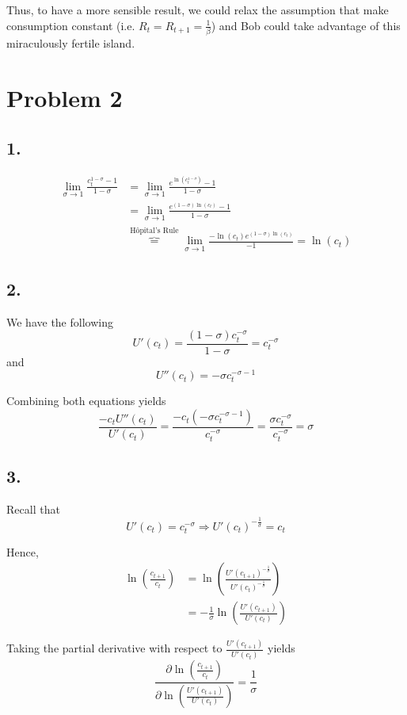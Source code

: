 \documentclass[12pt]{article}
\theoremstyle{definition}
\begin{document}
Thus, to have a more sensible result, we could relax the assumption that make consumption constant (i.e. $R_{t}=R_{t+1}=\frac{1}{\beta}$) and Bob could take advantage of this miraculously fertile island.

\section*{Problem 2}
\subsection*{1.}

\[
\begin{split}
\lim_{\sigma\to 1 } \frac{c_t^{1-\sigma}-1}{1-\sigma} &= \lim_{\sigma\to 1 } \frac{e^{\ln(c_t^{1-\sigma})}-1}{1-\sigma} \\
&= \lim_{\sigma\to 1 } \frac{e^{(1-\sigma)\ln(c_t)}-1}{1-\sigma} \\
&\overbrace{=}^{\text{Hôpital's Rule}} \lim_{\sigma\to 1 } \frac{-\ln(c_t)e^{(1-\sigma)\ln(c_t)}}{-1} = \ln(c_t)
\end{split}
\]

\subsection*{2.}
We have the following
\[
U'(c_t) = \frac{(1-\sigma)c_t^{-\sigma}}{1-\sigma} = c_t^{-\sigma}
\]
and
\[
U''(c_t) = -\sigma c_t^{-\sigma-1}
\]

Combining both equations yields
\[
\frac{-c_tU''(c_t)}{U'(c_t)}= \frac{-c_t(-\sigma c_t^{-\sigma-1})}{c_t^{-\sigma}} = \frac{\sigma c_t^{-\sigma}}{c_t^{-\sigma}} =\sigma
\]


\subsection*{3.}
Recall that
\[
U'(c_t) = c_t^{-\sigma} \Rightarrow U'(c_t)^{-\frac{1}{\sigma}} = c_t
\]

Hence,
\[
\begin{split}
\ln\left(\frac{c_{t+1}}{c_t}\right) & = \ln\left(\frac{U'(c_{t+1})^{-\frac{1}{\sigma}}}{U'(c_{t})^{-\frac{1}{\sigma}}}\right)\\
& = -\frac{1}{\sigma} \ln\left(\frac{U'(c_{t+1})}{U'(c_{t})}\right)
\end{split}
\]

Taking the partial derivative with respect to $\frac{U'(c_{t+1})}{U'(c_{t})}$ yields
\[
\frac{\partial \ln\left(\frac{c_{t+1}}{c_t}\right) }{\partial \ln\left(\frac{U'(c_{t+1})}{U'(c_{t})}\right)} = \frac{1}{\sigma}
\]
\end{document}
